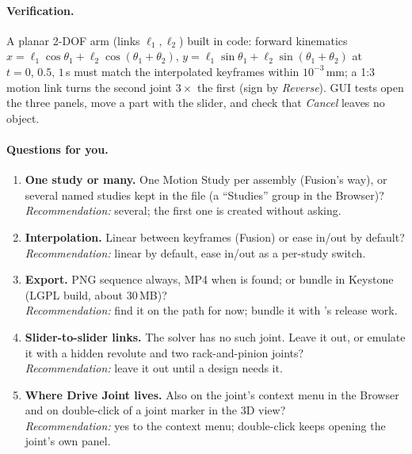 \paragraph{Verification.} A planar 2-DOF arm (links $\ell_1,\ell_2$) built in code: forward kinematics
$x=\ell_1\cos\theta_1+\ell_2\cos(\theta_1+\theta_2)$, $y=\ell_1\sin\theta_1+\ell_2\sin(\theta_1+\theta_2)$ at
$t=0,\,0.5,\,1$\,s must match the interpolated keyframes within $10^{-3}$\,mm; a 1:3 motion link turns the second
joint $3\times$ the first (sign by \emph{Reverse}). GUI tests open the three panels, move a part with the slider,
and check that \emph{Cancel} leaves no object.

\paragraph{Questions for you.}
\begin{enumerate}[label=M\arabic*.]
  \item \textbf{One study or many.} One Motion Study per assembly (Fusion's way), or several named studies kept
        in the file (a ``Studies'' group in the Browser)?\\
        \emph{Recommendation:} several; the first one is created without asking.
  \item \textbf{Interpolation.} Linear between keyframes (Fusion) or ease in/out by default?\\
        \emph{Recommendation:} linear by default, ease in/out as a per-study switch.
  \item \textbf{Export.} PNG sequence always, MP4 when  is found; or bundle  in Keystone
        (LGPL build, about 30\,MB)?\\
        \emph{Recommendation:} find it on the path for now; bundle it with 's release work.
  \item \textbf{Slider-to-slider links.} The solver has no such joint. Leave it out, or emulate it with a hidden
        revolute and two rack-and-pinion joints?\\
        \emph{Recommendation:} leave it out until a design needs it.
  \item \textbf{Where Drive Joint lives.} Also on the joint's context menu in the Browser and on double-click of a
        joint marker in the 3D view?\\
        \emph{Recommendation:} yes to the context menu; double-click keeps opening the joint's own panel.
\end{enumerate}
